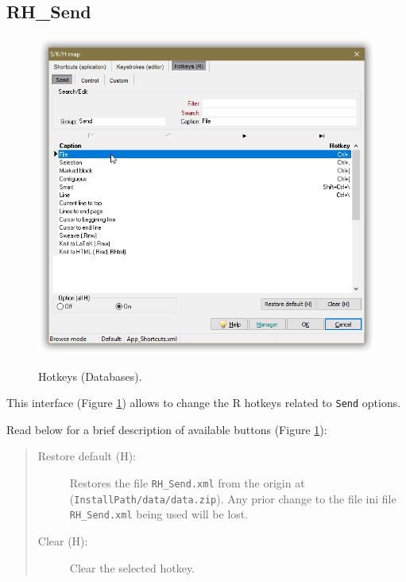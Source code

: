 \subsection{RH\_Send}

\begin{figure}[H]
  \includegraphics[scale=0.35]{./res/skh_map_rh_send_dlg.png}\\
  \caption{Hotkeys (Databases).}
  \label{fig:rh_send_dlg}
\end{figure}

This interface
(Figure \ref{fig:rh_send_dlg})
allows to change the R hotkeys related to \texttt{Send} options.

Read below for a brief description of available buttons (Figure \ref{fig:rh_send_dlg}):

\begin{quote}
  \begin{footnotesize}
    \begin{description}
      \item[Restore default (H):]
        Restores the file \texttt{RH\_Send.xml} from the origin at
        (\texttt{InstallPath/data/data.zip}). Any prior change to the file ini file
        \texttt{RH\_Send.xml} being used will be lost.
      \item[Clear (H):]
        Clear the selected hotkey.
    \end{description}
  \end{footnotesize}
\end{quote}


